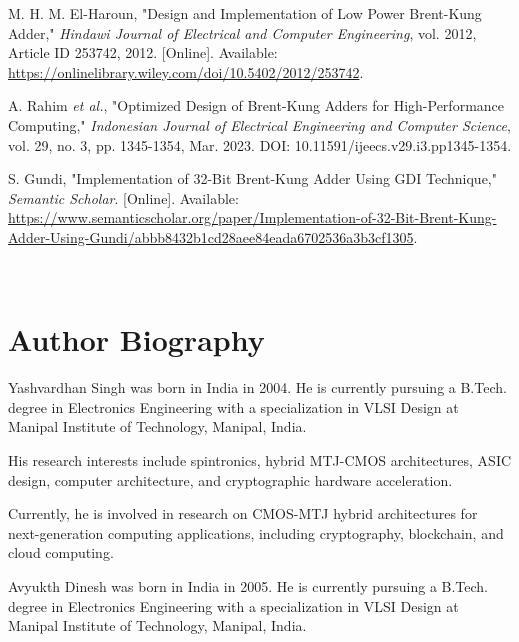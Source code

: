 \documentclass{IEEEtran}
\begin{document}
\begin{thebibliography}{10}
 M. H. M. El-Haroun, "Design and Implementation of Low Power Brent-Kung Adder," \textit{Hindawi Journal of Electrical and Computer Engineering}, vol. 2012, Article ID 253742, 2012. [Online]. Available: \url{https://onlinelibrary.wiley.com/doi/10.5402/2012/253742}.

 A. Rahim \textit{et al.}, "Optimized Design of Brent-Kung Adders for High-Performance Computing," \textit{Indonesian Journal of Electrical Engineering and Computer Science}, vol. 29, no. 3, pp. 1345-1354, Mar. 2023. DOI: 10.11591/ijeecs.v29.i3.pp1345-1354.

 S. Gundi, "Implementation of 32-Bit Brent-Kung Adder Using GDI Technique," \textit{Semantic Scholar}. [Online]. Available: \url{https://www.semanticscholar.org/paper/Implementation-of-32-Bit-Brent-Kung-Adder-Using-Gundi/abbb8432b1cd28aee84eada6702536a3b3cf1305}.

\end{thebibliography}

\\
\section*{Author Biography}
\begin{IEEEbiography}{Yashvardhan Singh}
was born in India in 2004. He is currently pursuing a B.Tech. degree in Electronics Engineering with a specialization in VLSI Design at Manipal Institute of Technology, Manipal, India.

His research interests include spintronics, hybrid MTJ-CMOS architectures, ASIC design, computer architecture, and cryptographic hardware acceleration. 

Currently, he is involved in research on CMOS-MTJ hybrid architectures for next-generation computing applications, including cryptography, blockchain, and cloud computing.
\end{IEEEbiography}
\begin{IEEEbiography}{Avyukth Dinesh}
was born in India in 2005. He is currently pursuing a B.Tech. degree in Electronics Engineering with a specialization in VLSI Design at Manipal Institute of Technology, Manipal, India.

\end{IEEEbiography}
\end{document}
